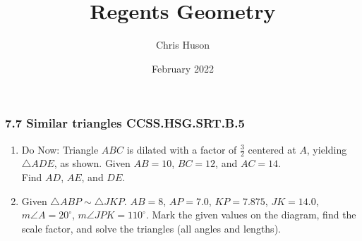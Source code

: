 \documentclass[12pt, twoside]{article}
\title{Regents Geometry}
\author{Chris Huson}
\date{February 2022}
\begin{document}
\subsubsection*{7.7 Similar triangles \hfill CCSS.HSG.SRT.B.5}
\begin{enumerate}
\item Do Now: Triangle $ABC$ is dilated with a factor of $\frac{3}{2}$ centered at $A$, yielding $\triangle ADE$, as shown. Given $AB=10$, $BC=12$, and $AC=14$. \\[0.25cm] Find $AD$, $AE$, and $DE$.
  \begin{flushright}
    \end{flushright} \vspace{1cm}

\item Given $\triangle ABP \sim \triangle JKP$. $AB=8$, $AP=7.0$, $KP=7.875$, $JK=14.0$, $m\angle A=20^\circ$, $m\angle JPK = 110^\circ$. Mark the given values on the diagram, find the scale factor, and solve the triangles (all angles and lengths).
  \begin{center}
  \end{center}


\end{enumerate}
\end{document}
